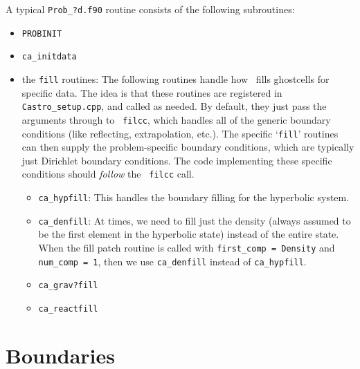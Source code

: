 A typical {\tt Prob\_?d.f90} routine consists of the following 
subroutines:
\begin{itemize}
\item {\tt PROBINIT}

\item {\tt ca\_initdata}

\item the {\tt *fill} routines: The following routines handle how
  \castro\ fills ghostcells for specific data.  The idea is that these
  routines are registered in {\tt Castro\_setup.cpp}, and called as
  needed.  By default, they just pass the arguments through to {\tt
    filcc}, which handles all of the generic boundary conditions (like
  reflecting, extrapolation, etc.).  The specific `{\tt fill}'
  routines can then supply the problem-specific boundary conditions,
  which are typically just Dirichlet boundary conditions.  The code
  implementing these specific conditions should {\em follow} the {\tt
    filcc} call.

\begin{itemize}
\item {\tt ca\_hypfill}:
  This handles the boundary filling for the hyperbolic system.

\item {\tt ca\_denfill}: At times, we need to fill just the density
  (always assumed to be the first element in the hyperbolic state)
  instead of the entire state.  When the fill patch routine is called
  with {\tt first\_comp = Density} and {\tt num\_comp = 1}, then we
  use {\tt ca\_denfill} instead of {\tt ca\_hypfill}.

\item {\tt ca\_grav?fill}

\item {\tt ca\_reactfill}
\end{itemize}

\end{itemize}


\section{Boundaries}
